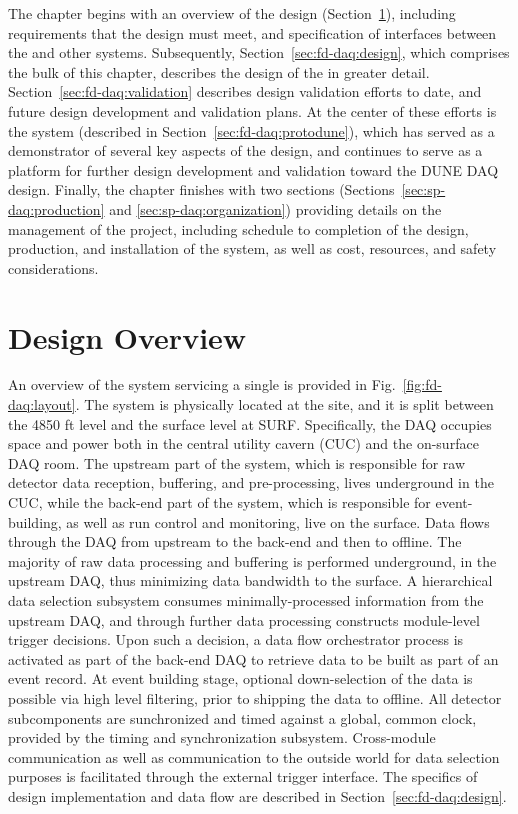 The chapter begins with an overview of the  design (Section~\ref{sec:fd-daq:overview}),
including requirements that the design must meet, and specification of
interfaces between the   and other   systems. 
Subsequently, Section~\ref{sec:fd-daq:design}, which comprises the
bulk of this chapter, describes the design of the 
 in greater detail.
Section~\ref{sec:fd-daq:validation} describes design validation efforts
to date, and future design development and validation plans. At the
center of these efforts is the 
  system (described in Section~\ref{sec:fd-daq:protodune}), which has served as a demonstrator of several
key aspects of the      design, and continues to serve as a
platform for further design development and validation toward the
DUNE DAQ design. 
Finally, the chapter finishes with two sections
(Sections~\ref{sec:sp-daq:production} and \ref{sec:sp-daq:organization}) providing details on
the management of the
 project, including schedule to completion of the design, 
production, and installation of the system, as well as cost, resources, and
safety considerations.

\section{Design Overview}
\label{sec:fd-daq:overview}

An overview of the    system 
servicing a single 
 is
provided in Fig.~\ref{fig:fd-daq:layout}. The system is
physically located at the  site, and it is split between the
4850 ft level and the surface level at SURF. Specifically, the DAQ occupies space and
power both in the central utility cavern (CUC) and the on-surface DAQ
room.  The upstream part of the system, which is responsible for
raw detector data reception, buffering, and pre-processing, lives
underground in the CUC, while the back-end part of the system, which is responsible for
event-building, as well as run control and monitoring, live on the
surface. Data flows through the DAQ from 
upstream to the back-end and then to offline. The majority
of raw data processing and buffering is performed underground, in the
upstream DAQ, thus minimizing data bandwidth to the surface. A
hierarchical data selection subsystem consumes minimally-processed
information from the upstream DAQ, and through further data processing
constructs module-level trigger decisions. Upon such a decision, a data
flow orchestrator process is activated as part of the back-end DAQ
to retrieve data to be built as part of an event record. At event
building stage, optional down-selection of the data is possible via
high level filtering, prior to shipping the data to offline.  All
detector subcomponents are sunchronized and timed against a global,
common clock, provided by the timing and synchronization
subsystem. Cross-module communication as well as communication
to the outside world for data selection purposes is facilitated
through the external trigger interface. The
specifics of design implementation and data flow are described in Section~\ref{sec:fd-daq:design}.

